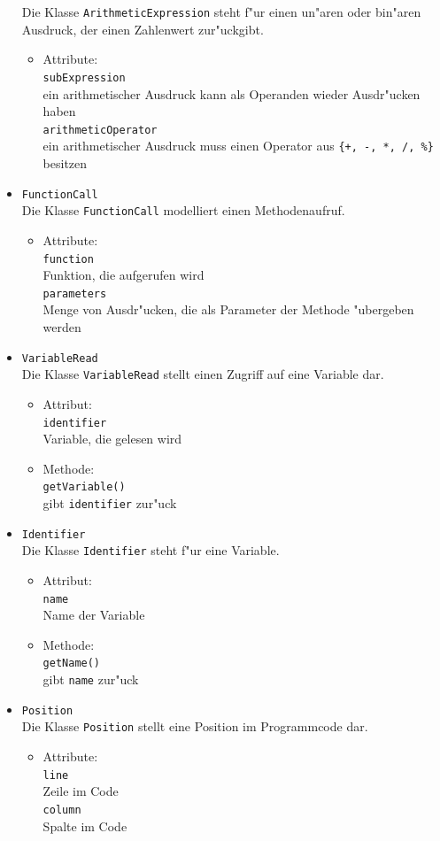 \documentclass[10pt,a4paper,titlepage]{article}
\begin{document}
\begin{itemize}
Die Klasse \texttt{ArithmeticExpression} steht f"ur einen un"aren oder bin"aren Ausdruck, der einen Zahlenwert zur"uckgibt.
\begin{itemize}
\item Attribute: \\
\texttt{subExpression} \\
ein arithmetischer Ausdruck kann als Operanden wieder Ausdr"ucken haben \\
\texttt{arithmeticOperator} \\
ein arithmetischer Ausdruck muss einen Operator aus \texttt{\{+, -, *, /, \%\}} besitzen 
\end{itemize}
\item \texttt{FunctionCall} \\
Die Klasse \texttt{FunctionCall} modelliert einen Methodenaufruf. 
\begin{itemize}
\item Attribute: \\
\texttt{function} \\
Funktion, die aufgerufen wird \\
\texttt{parameters} \\
Menge von Ausdr"ucken, die als Parameter der Methode "ubergeben werden
\end{itemize}
\item \texttt{VariableRead} \\
Die Klasse \texttt{VariableRead} stellt einen Zugriff auf eine Variable dar.
\begin{itemize}
\item Attribut: \\
\texttt{identifier} \\
Variable, die gelesen wird
\item Methode: \\
\texttt{getVariable()} \\
gibt \texttt{identifier} zur"uck
\end{itemize}
\item \texttt{Identifier} \\
Die Klasse \texttt{Identifier} steht f"ur eine Variable. 
\begin{itemize}
\item Attribut: \\
\texttt{name} \\
Name der Variable 
\item Methode: \\
\texttt{getName()} \\
gibt \texttt{name} zur"uck  
\end{itemize}
\item \texttt{Position} \\
Die Klasse \texttt{Position} stellt eine Position im Programmcode dar. 
\begin{itemize}
\item Attribute: \\
\texttt{line} \\
Zeile im Code \\
\texttt{column} \\
Spalte im Code \\
\end{itemize}
\end{itemize}
\end{document}

